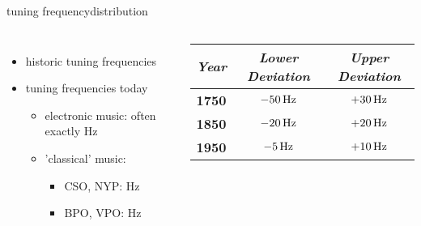        \begin{frame}{tuning frequency}{distribution}
        \vspace{-5mm}
        \begin{columns}
            \begin{itemize}
                \item historic tuning frequencies
                \item<2-> tuning frequencies today
                    \begin{itemize}
                        \item   electronic music: often exactly \unit[440]{Hz}
                        \item   'classical' music:
                            \begin{itemize}
                                \item CSO, NYP: \unit[442]{Hz}
                                \item BPO, VPO: \unit[443]{Hz}
                            \end{itemize}
                    \end{itemize}
            \end{itemize}
            \begin{footnotesize}
           \begin{table}
            \begin{tabular}{lcc} %
                \\ \hline
                \bf{\emph{Year}}	 & \bf{\emph{Lower Deviation}}	 & \bf{\emph{Upper Deviation}}\\ 
                 \hline
                \bf{1750}	 & $-\unit[50]{Hz}$	 & $+\unit[30]{Hz}$\\
                \bf{1850}	 & $-\unit[20]{Hz}$	 & $+\unit[20]{Hz}$\\
                \bf{1950}	 & $-\unit[5]{Hz}$	 & $+\unit[10]{Hz}$\\
            \end{tabular}
            \end{table}
            \end{footnotesize}
            
        \end{columns}
        \end{frame}
